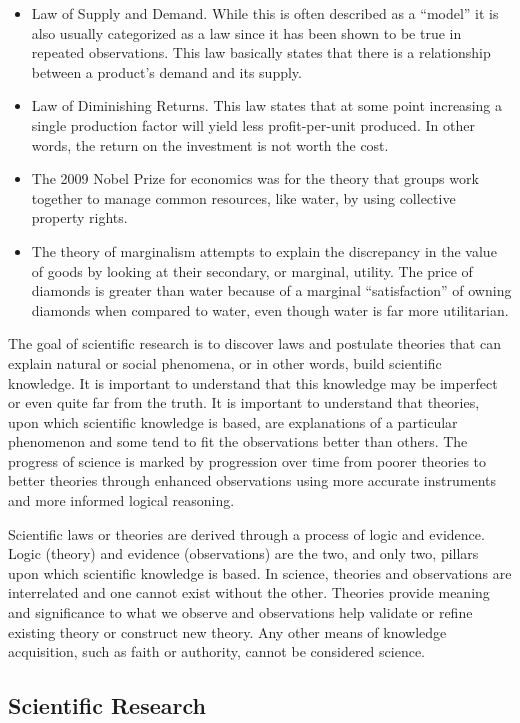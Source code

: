 \begin{itemize}
	\item Law of Supply and Demand. While this is often described as a ``model'' it is also usually categorized as a law since it has been shown to be true in repeated observations. This law basically states that there is a relationship between a product's demand and its supply.
	\item Law of Diminishing Returns. This law states that at some point increasing a single production factor will yield less profit-per-unit produced. In other words, the return on the investment is not worth the cost.
	\item The 2009 Nobel Prize for economics was for the theory that groups work together to manage common resources, like water, by using collective property rights.
	\item The theory of marginalism attempts to explain the discrepancy in the value of goods by looking at their secondary, or marginal, utility. The price of diamonds is greater than water because of a marginal ``satisfaction'' of owning diamonds when compared to water, even though water is far more utilitarian.  
\end{itemize}

The goal of scientific research is to discover laws and postulate theories that can explain natural or social phenomena, or in other words, build scientific knowledge. It is important to understand that this knowledge may be imperfect or even quite far from the truth. It is important to understand that theories, upon which scientific knowledge is based, are explanations of a particular phenomenon and some tend to fit the observations better than others. The progress of science is marked by progression over time from poorer theories to better theories through enhanced observations using more accurate instruments and more informed logical reasoning.

Scientific laws or theories are derived through a process of logic and evidence. Logic (theory) and evidence (observations) are the two, and only two, pillars upon which scientific knowledge is based. In science, theories and observations are interrelated and one cannot exist without the other. Theories provide meaning and significance to what we observe and observations help validate or refine existing theory or construct new theory. Any other means of knowledge acquisition, such as faith or authority, cannot be considered science.

\subsection{Scientific Research}

